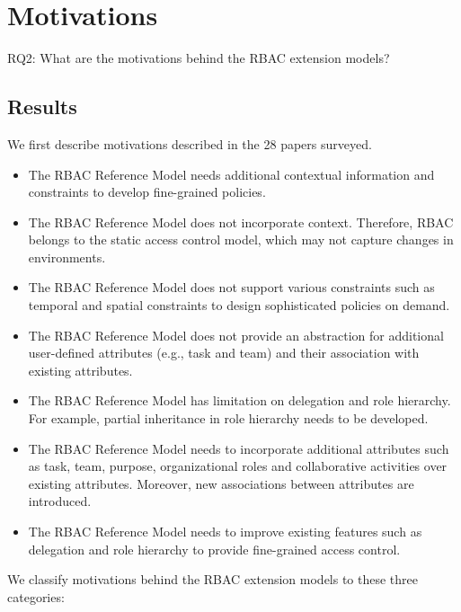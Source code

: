 \section{Motivations} \label{sec:motivations}

RQ2: What are the motivations behind the RBAC extension models?

\subsection{Results}

We first describe motivations described in the 28 papers surveyed.

\begin{itemize}
\setlength{\itemsep}{0.25pt}
\item The RBAC Reference Model needs additional contextual information and constraints to develop fine-grained policies.
\item The RBAC Reference Model does not incorporate context. Therefore, RBAC belongs to the static access control model, which may not capture changes in environments.
\item The RBAC Reference Model does not support various constraints such as temporal and spatial constraints to design sophisticated policies on demand.
\item The RBAC Reference Model does not provide an abstraction for additional user-defined attributes	(e.g., task and team) and their association with existing attributes.
\item The RBAC Reference Model has limitation on delegation and role hierarchy. For example, partial inheritance in role hierarchy needs to be developed.  
\item The RBAC Reference Model needs to incorporate additional attributes such as
task, team, purpose, organizational roles and collaborative activities over existing attributes. Moreover, new associations between attributes
are introduced. 
\item The RBAC Reference Model needs to improve existing features such as delegation and role hierarchy to provide fine-grained access control. 
\end{itemize}


We classify motivations behind the RBAC extension models to these three categories:

